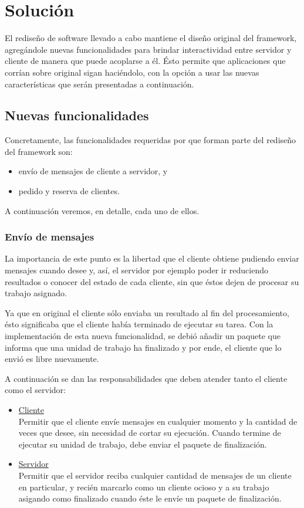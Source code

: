 \chapter{Solución}

El rediseño de software llevado a cabo mantiene el diseño original del framework, agregándole nuevas funcionalidades para brindar
interactividad entre servidor y cliente de manera que \rc{} puede acoplarse a él. Ésto permite que aplicaciones que corrían sobre \fud{}
original sigan haciéndolo, con la opción a usar las nuevas características que serán presentadas a continuación.

\section{Nuevas funcionalidades}

Concretamente, las funcionalidades requeridas por \rc{} que forman parte del rediseño del framework son:
\begin{itemize}
    \item   envío de mensajes de cliente a servidor, y
    \item   pedido y reserva de clientes.
\end{itemize}
A continuación veremos, en detalle, cada uno de ellos.

\subsection{Envío de mensajes}

La importancia de este punto es la libertad que el cliente obtiene pudiendo enviar mensajes cuando desee y, así, el servidor por ejemplo
poder ir reduciendo resultados o conocer del estado de cada cliente, sin que éstos dejen de procesar su trabajo asignado.

Ya que en \fud{} original el cliente sólo enviaba un resultado al fin del procesamiento, ésto significaba que el cliente había terminado de
ejecutar su tarea. Con la implementación de esta nueva funcionalidad, se debió añadir un paquete que informa que una unidad de trabajo ha
finalizado y por ende, el cliente que lo envió es libre nuevamente.

A continuación se dan las responsabilidades que deben atender tanto el cliente como el servidor:
\begin{itemize}
    \item   \underline{Cliente}\\Permitir que el cliente envíe mensajes en cualquier momento y la cantidad de veces que desee, sin necesidad
            de cortar su ejecución. Cuando termine de ejecutar su unidad de trabajo, debe enviar el paquete de finalización.
    \item   \underline{Servidor}\\Permitir que el servidor reciba cualquier cantidad de mensajes de un cliente en particular, y recién
            marcarlo como un cliente ocioso y a su trabajo asigando como finalizado cuando éste le envíe un paquete de finalización.
\end{itemize}



